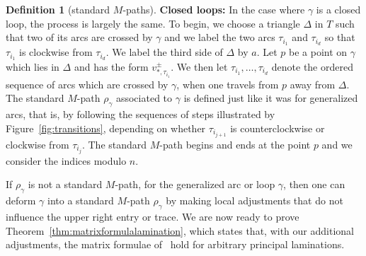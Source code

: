 \documentclass[pdftex]{sigma}
\numberwithin{equation}{section}
\theoremstyle{definition}
\newtheorem{Definition}[Theorem]{Definition}
\begin{document}
\begin{Definition}[standard $M$-paths]
\textbf{Closed loops:} In the case where $\gamma$ is a closed loop, the process is largely the same. To begin, we choose a triangle $\Delta$ in $T$ such that two of its arcs are crossed by $\gamma$ and we label the two arcs $\tau_{i_1}$ and $\tau_{i_d}$ so that $\tau_{i_1}$ is clockwise from $\tau_{i_d}$. We label the third side of $\Delta$ by $a$. Let $p$ be a point on $\gamma$ which lies in $\Delta$ and has the form $v^{\pm}_{*, \tau_{i_1}}$. We then let $\tau_{i_1}, \ldots,\tau_{i_d}$ denote the ordered sequence of arcs which are crossed by $\gamma$, when one travels from $p$ away from $\Delta$. The standard $M$-path $\rho_{\gamma}$ associated to $\gamma$ is defined just like it was for generalized arcs, that is, by following the sequences of steps illustrated by Figure~\ref{fig:transitions}, depending on whether $\tau_{i_{j+1}}$ is counterclockwise or clockwise from $\tau_{i_j}$. The standard $M$-path begins and ends at the point $p$ and we consider the indices modulo $n$.
\end{Definition}

If $\rho_{\gamma}$ is not a standard $M$-path, for the generalized arc or loop $\gamma$, then one can deform $\gamma$ into a standard $M$-path $\rho_{\gamma}$ by making local adjustments that do not influence the upper right entry or trace.
We are now ready to prove Theorem~\ref{thm:matrixformulalamination}, which states that, with our additional adjustments, the matrix formulae of~\cite{MW13} hold for arbitrary principal laminations.
\end{document}

